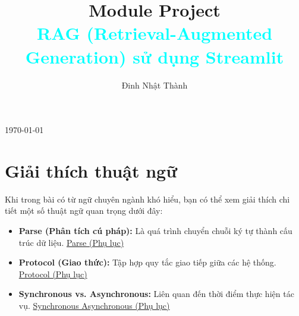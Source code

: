 \documentclass[11pt]{article}
\title{{Module Project}\\[0.5em]\textcolor{cyan}{RAG (Retrieval-Augmented Generation) sử dụng Streamlit}}
\author{Đinh Nhật Thành}
\date{}
\renewcommand{\maketitle}{}
\begin{document}
\maketitle

\begin{titlepage}
    \centering
    \vspace*{\fill}

    {\Huge \textbf{\thetitle} \par}
    \vspace{2em}

    {\Large \textbf{\theauthor} \par}
    \vspace{1em}

    {\large \today \par}

    \vspace*{\fill}
    \thispagestyle{fancy}
\end{titlepage}

\newpage
\tableofcontents
\thispagestyle{fancy}

\setlength{\parindent}{2em} %


\newpage

\renewcommand{\thesubsection}{\arabic{subsection}}
\newpage

\section{Giải thích thuật ngữ}
Khi trong bài có từ ngữ chuyên ngành khó hiểu, bạn có thể xem giải thích chi tiết một số thuật ngữ quan trọng dưới đây:

\begin{itemize}
    \item \textbf{Parse (Phân tích cú pháp):}
    Là quá trình chuyển chuỗi ký tự thành cấu trúc dữ liệu. \hyperref[app:parse]{Parse (Phụ lục)}

    \item \textbf{Protocol (Giao thức):}
    Tập hợp quy tắc giao tiếp giữa các hệ thống. \hyperref[app:protocol]{Protocol (Phụ lục)}

    \item \textbf{Synchronous vs. Asynchronous:}
    Liên quan đến thời điểm thực hiện tác vụ. \hyperref[app:synchronous_asynchronous]{Synchronous Asynchronous (Phụ lục)}
\end{itemize}
\end{document}
